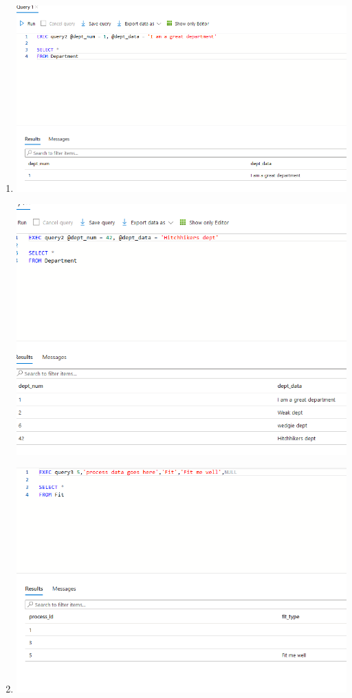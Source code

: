 \documentclass[11pt]{article}
\begin{document}
\begin{enumerate}
\item
\includegraphics[width = \textwidth]{insertDept1.png}

\includegraphics[width = \textwidth]{insertDept2.png}




\item
\includegraphics[width = \textwidth]{insertProcess1.png}


\end{enumerate}
\end{document}

